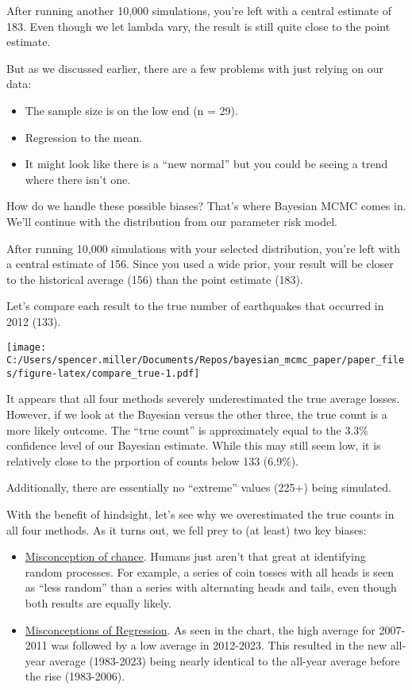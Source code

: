 \documentclass[
]{article}
\providecommand{\tightlist}{%
  \setlength{\itemsep}{0pt}\setlength{\parskip}{0pt}}
\begin{document}
After running another 10,000 simulations, you're left with a central
estimate of 183. Even though we let lambda vary, the result is still
quite close to the point estimate.

But as we discussed earlier, there are a few problems with just relying
on our data:

\begin{itemize}
\tightlist
\item
  The sample size is on the low end (n = 29).
\item
  Regression to the mean.
\item
  It might look like there is a ``new normal'' but you could be seeing a
  trend where there isn't one.
\end{itemize}

How do we handle these possible biases? That's where Bayesian MCMC comes
in. We'll continue with the distribution from our parameter risk model.

After running 10,000 simulations with your selected distribution, you're
left with a central estimate of 156. Since you used a wide prior, your
result will be closer to the historical average (156) than the point
estimate (183).

Let's compare each result to the true number of earthquakes that
occurred in 2012 (133).

\texttt{[image: C:/Users/spencer.miller/Documents/Repos/bayesian\_mcmc\_paper/paper\_files/figure-latex/compare\_true-1.pdf]}

It appears that all four methods severely underestimated the true
average losses. However, if we look at the Bayesian versus the other
three, the true count is a more likely outcome. The ``true count'' is
approximately equal to the 3.3\% confidence level of our Bayesian
estimate. While this may still seem low, it is relatively close to the
prportion of counts below 133 (6.9\%).

Additionally, there are essentially no ``extreme'' values (225+) being
simulated.

With the benefit of hindsight, let's see why we overestimated the true
counts in all four methods. As it turns out, we fell prey to (at least)
two key biases:

\begin{itemize}
\tightlist
\item
  \ul{Misconception of chance}. Humans just aren't that great at
  identifying random processes. For example, a series of coin tosses
  with all heads is seen as ``less random'' than a series with
  alternating heads and tails, even though both results are equally
  likely.
\item
  \ul{Misconceptions of Regression}. As seen in the chart, the high
  average for 2007-2011 was followed by a low average in 2012-2023. This
  resulted in the new all-year average (1983-2023) being nearly
  identical to the all-year average before the rise (1983-2006).
\end{itemize}
\end{document}
